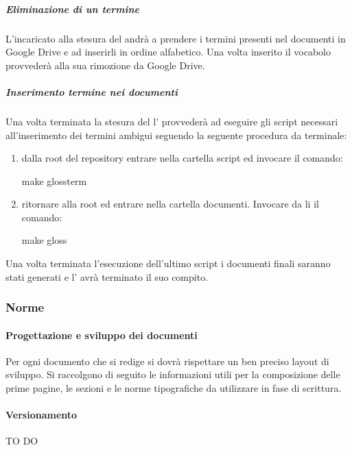 				\subparagraph{Eliminazione di un termine}
				L'incaricato alla stesura del \docNameVersionGlo{} andrà a prendere i termini presenti nel documenti in Google Drive e ad inserirli in ordine alfabetico. Una volta inserito il vocabolo provvederà alla sua rimozione da Google Drive.
				
				\subparagraph{Inserimento termine nei documenti} %
				\label{subp:inserimento_termine_nei_documenti}
				Una volta terminata la stesura del \docNameVersionGlo{} l'\roleAdministrator{} provvederà ad eseguire gli script necessari all'inserimento dei termini ambigui seguendo la seguente procedura da terminale:
					\begin{enumerate}
						\item dalla root del repository entrare nella cartella script ed invocare il comando:
							\begin{center}
								make glossterm
							\end{center}
						\item ritornare alla root ed entrare nella cartella documenti. Invocare da li il comando:
							\begin{center}
								make gloss
							\end{center}
					\end{enumerate}
				\noindent
				Una volta terminata l'esecuzione dell'ultimo script i documenti finali saranno stati generati e l'\roleAdministrator{} avrà terminato il suo compito.
				

		\subsubsection{Norme}

			\paragraph{Progettazione e sviluppo dei documenti}
			Per ogni documento che si redige si dovrà rispettare un ben preciso layout di sviluppo. Si raccolgono di seguito le informazioni utili per la composizione delle prime pagine, le sezioni e le norme tipografiche da utilizzare in fase di scrittura.

			\paragraph{Versionamento} TO DO

